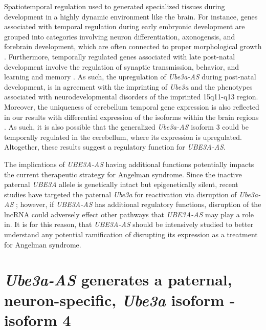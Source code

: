 Spatiotemporal regulation used to generated specialized tissues during development in a highly dynamic environment like the brain. For instance, genes associated with temporal regulation during early embryonic development are grouped into categories involving neuron differentiation, axonogensis, and forebrain development, which are often connected to proper morphological growth \cite{Liscovitch2013}. Furthermore, temporally regulated genes associated with late post-natal development involve the regulation of synaptic transmission, behavior, and learning and memory \cite{Liscovitch2013}. 
As such, the upregulation of \textit{Ube3a-AS} during post-natal development, is in agreement with the imprinting of \textit{Ube3a} and the phenotypes associated with neurodevelopmental disorders of the imprinted 15q11-q13 region. Moreover, the uniqueness of cerebellum temporal gene expression is also reflected in our results with differential expression of the isoforms within the brain regions \cite{Liscovitch2013,Lein2006,Zapala2005}. As such, it is also possible that the generalized \textit{Ube3a-AS} isoform 3 could be temporally regulated in the cerebellum, where its expression is upregulated. Altogether, these results suggest a regulatory function for \textit{UBE3A-AS}.

The implications of \textit{UBE3A-AS} having additional functions potentially impacts the current therapeutic strategy for Angelman syndrome. Since the inactive paternal \textit{UBE3A} allele is genetically intact but epigenetically silent, recent studies have targeted the paternal \textit{Ube3a} for reactivation via disruption of \textit{Ube3a-AS} \cite{Meng2013,Elgersma2007,Huang2012,Meng2015,Shi2015,Bailus2016}; however, if \textit{UBE3A-AS} has additional regulatory functions, disruption of the lncRNA could adversely effect other pathways that \textit{UBE3A-AS} may play a role in. It is for this reason, that \textit{UBE3A-AS} should be intensively studied to better understand any potential ramification of disrupting its expression as a treatment for Angelman syndrome.

\section{\textit{Ube3a-AS} generates a paternal, neuron-specific, \textit{Ube3a} isoform - isoform 4}

